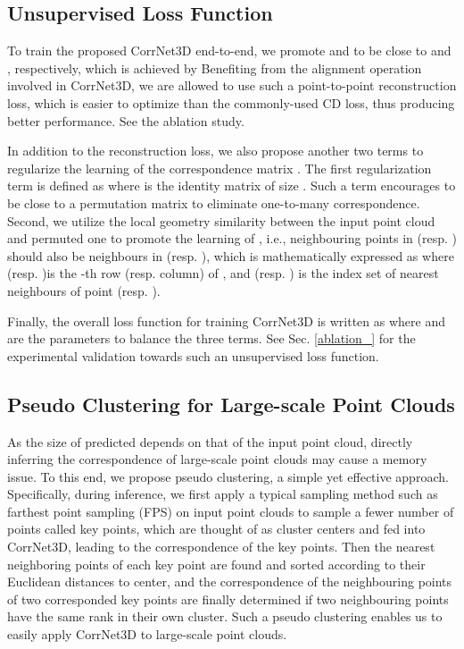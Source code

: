 \documentclass[final]{cvpr}
\begin{document}

\fi


\subsection{Unsupervised Loss Function}
To train the proposed CorrNet3D end-to-end,  we promote  and  to be close to  and , respectively, which is achieved by   
Benefiting from the alignment operation involved in CorrNet3D, we are allowed to use such a point-to-point reconstruction loss, which is easier to optimize than the commonly-used CD loss, thus producing better performance. See the ablation study.  



In addition to the reconstruction loss, 
we also propose another two terms to regularize the learning of the correspondence matrix . The first regularization term is defined as 
where  is the identity matrix of size . Such a term  encourages  to be close to a permutation matrix to eliminate one-to-many correspondence. Second, we utilize the local geometry similarity between the input point cloud and permuted one to promote the learning of , i.e., neighbouring points in  (resp. ) should also be neighbours in  (resp. ), which is mathematically expressed as 
where  (resp. )is the -th row (resp. column) of , and  (resp. ) is the index set of  nearest neighbours of point  (resp. ). 

Finally, the overall loss function for training CorrNet3D is written as 
where  and  are the parameters to balance the three terms. See Sec. \ref{ablation_} for the experimental validation towards such an unsupervised loss function. 

\subsection{Pseudo Clustering for Large-scale Point Clouds}\label{Pseudo}
As the size of predicted  depends on that of the input point cloud, directly inferring the correspondence of large-scale point clouds may cause a memory issue. To this end, we propose pseudo clustering, 
a simple yet effective approach. Specifically, during inference, we first apply a typical sampling method such as farthest point sampling (FPS) on input point clouds to sample a fewer number of points called key points, which are thought of as cluster centers and  fed into CorrNet3D, leading to the correspondence of the key points. Then the nearest neighboring points of each key point are found and sorted according to their Euclidean distances to center, and the correspondence of the neighbouring points of two corresponded key points are finally determined if two neighbouring points have the same rank in their own cluster. Such a pseudo clustering enables us to easily apply CorrNet3D to large-scale point clouds. 
\end{document}
